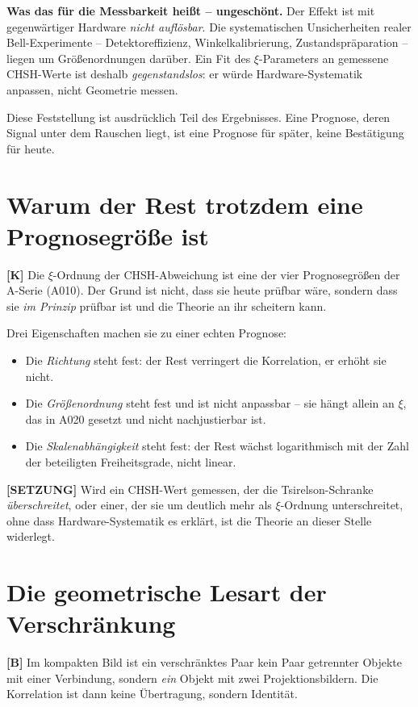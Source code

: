 \textbf{Was das für die Messbarkeit heißt -- ungeschönt.} Der Effekt ist mit
gegenwärtiger Hardware \emph{nicht auflösbar}. Die systematischen Unsicherheiten
realer Bell-Experimente -- Detektoreffizienz, Winkelkalibrierung,
Zustandspräparation -- liegen um Größenordnungen darüber. Ein Fit des
$\xi$-Parameters an gemessene CHSH-Werte ist deshalb \emph{gegenstandslos}:
er würde Hardware-Systematik anpassen, nicht Geometrie messen.

Diese Feststellung ist ausdrücklich Teil des Ergebnisses. Eine Prognose, deren
Signal unter dem Rauschen liegt, ist eine Prognose für später, keine Bestätigung
für heute.

\section{Warum der Rest trotzdem eine Prognosegröße ist}

\textbf{[K]} Die $\xi$-Ordnung der CHSH-Abweichung ist eine der vier
Prognosegrößen der A-Serie (A010). Der Grund ist nicht, dass sie heute prüfbar
wäre, sondern dass sie \emph{im Prinzip} prüfbar ist und die Theorie an ihr
scheitern kann.

Drei Eigenschaften machen sie zu einer echten Prognose:

\begin{itemize}
  \item Die \emph{Richtung} steht fest: der Rest verringert die Korrelation,
    er erhöht sie nicht.
  \item Die \emph{Größenordnung} steht fest und ist nicht anpassbar -- sie
    hängt allein an $\xi$, das in A020 gesetzt und nicht nachjustierbar ist.
  \item Die \emph{Skalenabhängigkeit} steht fest: der Rest wächst
    logarithmisch mit der Zahl der beteiligten Freiheitsgrade, nicht linear.
\end{itemize}

\textbf{[SETZUNG]} Wird ein CHSH-Wert gemessen, der die Tsirelson-Schranke
\emph{überschreitet}, oder einer, der sie um deutlich mehr als $\xi$-Ordnung
unterschreitet, ohne dass Hardware-Systematik es erklärt, ist die Theorie an
dieser Stelle widerlegt.

\section{Die geometrische Lesart der Verschränkung}

\textbf{[B]} Im kompakten Bild ist ein verschränktes Paar kein Paar getrennter
Objekte mit einer Verbindung, sondern \emph{ein} Objekt mit zwei
Projektionsbildern. Die Korrelation ist dann keine Übertragung, sondern
Identität.

